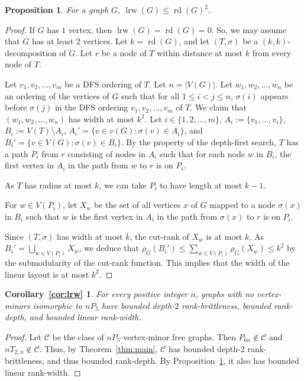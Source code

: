 \documentclass[11pt]{article}
\newtheorem{proposition}[theorem]{Proposition}
\newtheorem*{corollarylrw}{Corollary~\ref{cor:lrw}}
\newcommand\abs[1]{\lvert #1\rvert}
\newcommand\lrw{\operatorname{lrw}}
\newcommand\rd{\operatorname{rd}}
\begin{document}
	\begin{proposition}\label{prop:inequality}
          For a graph $G$, $\lrw(G)\le \rd (G)^2$.
	\end{proposition}
	\begin{proof}
	If $G$ has $1$ vertex, then $\lrw(G)=\rd(G)=0$. So, we may assume that $G$ has at least $2$ vertices.
	Let $k=\rd(G)$, and let $(T, \sigma)$ be a $(k,k)$-decomposition of $G$.
	Let $r$ be a node of $T$ within distance at most $k$ from every node of $T$.
	
	Let $v_1, v_2, \ldots, v_m$ be a DFS ordering of $T$.
        Let $n=\abs{V(G)}$.
        Let $w_1,w_2,\ldots,w_n$ be an ordering of the vertices of $G$
        such that for all $1\le i<j\le n$, $\sigma(i)$ appears before $\sigma(j)$
        in the DFS ordering $v_1,v_2,\ldots,v_m$ of $T$.
	We claim that $(w_1, w_2, \ldots, w_n)$ has width at most $k^2$.
	Let $i\in \{1, 2, \ldots, m\}$, $A_i:=\{v_1, \ldots, v_i\}$,  $B_i:=V(T)\setminus A_i$,
        $A_i'=\{v\in v(G): \sigma(v)\in A_i\}$,
        and $B_i'=\{v\in V(G):\sigma(v)\in B_i\}$.
	By the property of the depth-first search,
        $T$ has a path $P_i$ from $r$ consisting of nodes in $A_i$
        such that
        for each node $w$ in $B_i$,
        the first vertex in $A_i$ 
        in the path from $w$ to $r$ is on $P_i$. 

        As $T$ has radius at most $k$,
        we can take $P_i$ to have length at most $k-1$.

        For $w\in V(P_i)$, let $X_w$ be the set of all vertices $x$ of $G$
        mapped to a node $\sigma(x)$ in $B_i$
        such that $w$ is  the first vertex in $A_i$ 
        in the path from $\sigma(x)$ to $r$ is on $P_i$.

        Since $(T,\sigma)$ has width at most $k$,
        the cut-rank of $X_w$ is at most $k$.
        As $B_i'=\bigcup_{w\in V(P_i)} X_w$,
        we deduce that
        $\rho_G(B_i')\le \sum_{w\in V(P_i)} \rho_G(X_w)\le k^2$
        by the submodularity of the cut-rank function.
        This implies that the width of the linear layout is at most $k^2$.
	\end{proof}
	
	\begin{corollarylrw}
          For every positive integer $n$,
          graphs with no vertex-minors isomorphic to $nP_5$
          have 
          bounded depth-$2$ rank-brittleness,
          bounded rank-depth, and bounded linear rank-width.
	\end{corollarylrw}
	\begin{proof}
	Let $\mathcal{C}$ be the class of $nP_5$-vertex-minor free graphs. Then $P_{6n}\notin \mathcal{C}$ and $nT_{2,n}\notin \mathcal{C}$.
	Thus, by Theorem~\ref{thm:main}, $\mathcal{C}$ has bounded depth-$2$ rank-brittleness, and thus bounded rank-depth.
	By Proposition~\ref{prop:inequality}, it also has bounded linear rank-width.
	\end{proof}
	
\end{document}
